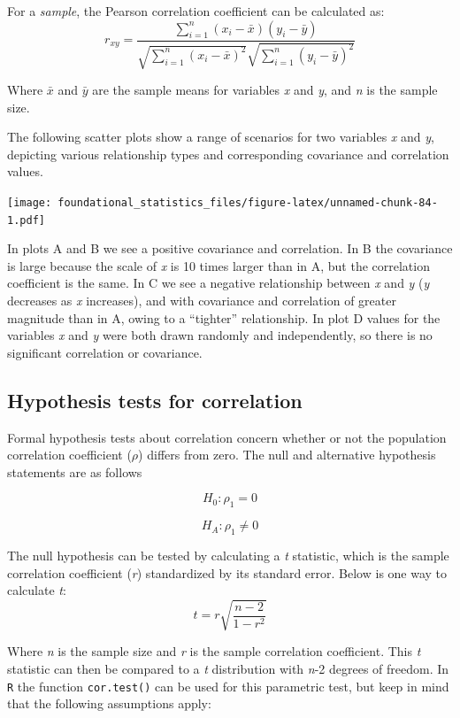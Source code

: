 \documentclass[]{book}
\begin{document}
For a \emph{sample}, the Pearson correlation coefficient can be calculated as:
\[r_{xy}=\frac{\sum_{i=1}^n (x_i-\bar{x})(y_i-\bar{y})}{\sqrt{\sum_{i=1}^n (x_i-\bar{x})^2}\sqrt{\sum_{i=1}^n (y_i-\bar{y})^2}}\]

Where \(\bar{x}\) and \(\bar{y}\) are the sample means for variables \emph{x} and \emph{y}, and \emph{n} is the sample size.

The following scatter plots show a range of scenarios for two variables \emph{x} and \emph{y}, depicting various relationship types and corresponding covariance and correlation values.

\texttt{[image: foundational\_statistics\_files/figure-latex/unnamed-chunk-84-1.pdf]}

In plots A and B we see a positive covariance and correlation. In B the covariance is large because the scale of \emph{x} is 10 times larger than in A, but the correlation coefficient is the same. In C we see a negative relationship between \emph{x} and \emph{y} (\emph{y} decreases as \emph{x} increases), and with covariance and correlation of greater magnitude than in A, owing to a ``tighter'' relationship. In plot D values for the variables \emph{x} and \emph{y} were both drawn randomly and independently, so there is no significant correlation or covariance.

\hypertarget{hypothesis-tests-for-correlation}{%
\subsection{Hypothesis tests for correlation}\label{hypothesis-tests-for-correlation}}

Formal hypothesis tests about correlation concern whether or not the population correlation coefficient (\(\rho\)) differs from zero. The null and alternative hypothesis statements are as follows

\[H_0 : \rho_1 = 0\]

\[H_A: \rho_1 \neq 0\]

The null hypothesis can be tested by calculating a \emph{t} statistic, which is the sample correlation coefficient (\emph{r}) standardized by its standard error. Below is one way to calculate \emph{t}:
\[t=r\sqrt{\frac{n-2}{1-r^2}}\]

Where \emph{n} is the sample size and \emph{r} is the sample correlation coefficient. This \emph{t} statistic can then be compared to a \emph{t} distribution with \emph{n}-2 degrees of freedom. In \texttt{R} the function \texttt{cor.test()} can be used for this parametric test, but keep in mind that the following assumptions apply:
\end{document}
